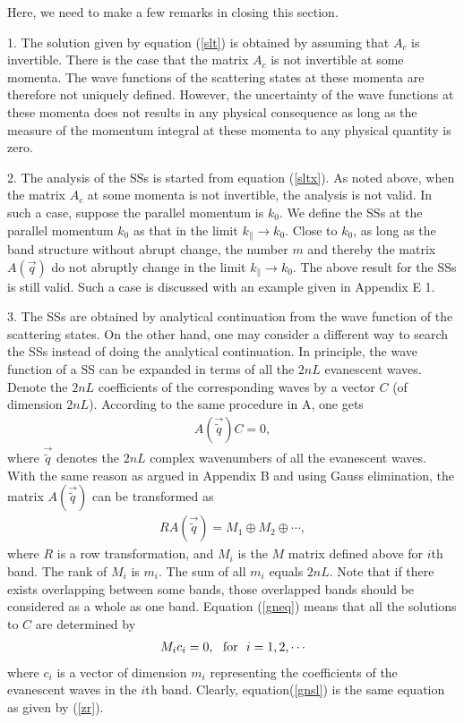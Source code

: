 \documentclass[aps,pra,amsmath,twocolumn,showpacs,bibnotes,10pt]{revtex4-1}
\begin{document}
Here, we need to make a few remarks in closing this section. 

1. The solution given by equation (\ref{slt}) is obtained by assuming that $A_c$ is invertible. There is the case that the matrix $A_c$ is not invertible at some momenta. The wave functions of the scattering states at these momenta are therefore not uniquely defined. However, the uncertainty of the wave functions at these momenta does not results in any physical consequence as long as the measure of the momentum integral at these momenta to any physical quantity is zero.   

2. The analysis of the SSs is started from equation (\ref{sltx}). As noted above, when the matrix $A_c$ at some momenta is not invertible, the analysis is not valid. In such a case, suppose the parallel momentum is $k_0$. We define the SSs at the parallel momentum $k_0$ as that in the limit $k_{\parallel} \to k_0$. Close to $k_0$, as long as the band structure without abrupt change, the number $m$ and thereby the matrix $A(\vec q)$ do not abruptly change in the limit $k_{\parallel} \to k_0$. The above result for the SSs is still valid. Such a case is discussed with an example given in Appendix E 1. 

3. The SSs are obtained by analytical continuation from the wave function of the scattering states. On the other hand, one may consider a different way to search the SSs instead of doing the analytical continuation. In principle, the wave function of a SS can be expanded in terms of all the $2nL$ evanescent waves. Denote the $2nL$ coefficients of the corresponding waves by a vector $C$ (of dimension $2nL$). According to the same procedure in A, one gets 
\begin{eqnarray}
A(\vec{\tilde q})C = 0, \nonumber
\end{eqnarray}
where $\vec{\tilde q}$ denotes the $2nL$ complex wavenumbers of all the evanescent waves. With the same reason as argued in Appendix B and using Gauss elimination, the matrix $A(\vec{\tilde q})$ can be transformed as
\begin{eqnarray}
RA(\vec{\tilde q}) = M_1 \oplus M_2 \oplus \cdots, \label{gneq}
\end{eqnarray}
where $R$ is a row transformation, and $M_i$ is the $M$ matrix defined above for $i$th band. The rank of $M_i$ is $m_i$. The sum of all $m_i$ equals $2nL$. Note that if there exists overlapping between some bands, those overlapped bands should be considered as a whole as one band. Equation (\ref{gneq}) means that all the solutions to $C$ are determined by 
\begin{eqnarray}
M_ic_i = 0,  ~~{\rm for}~~i = 1, 2,\cdots  \label{gnsl}
\end{eqnarray}
where $c_i$ is a vector of dimension $m_i$ representing the coefficients of the evanescent waves in the $i$th band. Clearly, equation(\ref{gnsl}) is the same equation as given by (\ref{zr}). 
\end{document}
